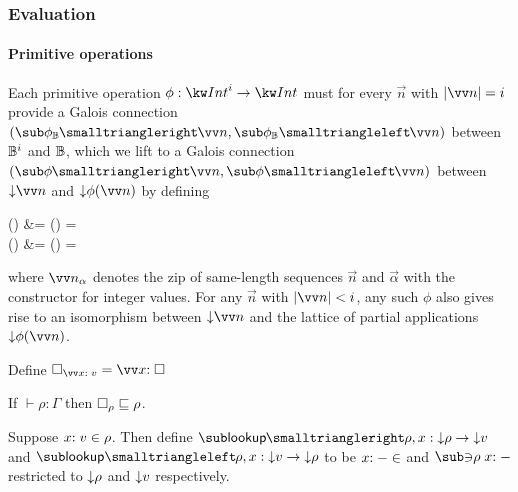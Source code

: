 \subsubsection{Evaluation}

\paragraph{Primitive operations}

Each primitive operation $\phi: \tyInt^{i} \to \tyInt$ must for every $\vec{n}$ with $\length{\vec{n}} = i$ provide a Galois connection $(\primFwdBool{\phi}{\vec{n}}, \primBwdBool{\phi}{\vec{n}})$ between $\mathbb{B}^i$ and $\mathbb{B}$, which we lift to a Galois connection $(\primFwd{\phi}{\vec{n}}, \primBwd{\phi}{\vec{n}})$ between $\Below{\vec{n}}$ and $\Below{\phi(\vec{n})}$ by defining
\begin{definition}
\label{def:core-language:primop-gc}
\begin{salign}
   () &= 
   (\vec{\alpha}) = \beta
   \\
   () &= 
   (\beta) = \vec{\alpha}
\end{salign}
\end{definition}

\noindent where $\vec{\annInt{n}{\alpha}}$ denotes the zip of same-length sequences $\vec{n}$ and $\vec{\alpha}$ with the constructor for integer values. For any $\vec{n}$ with $\length{\vec{n}} \numlt i$, any such $\phi$ also gives rise to an isomorphism between $\Below{\vec{n}}$ and the lattice of partial applications $\Below{\exPrimOp{\phi}{\vec{n}}}$.





\begin{definition}
Define $\hole_{\vec{\bind{x}{v}}} = \vec{\bind{x}{\hole}}$
\end{definition}

\begin{lemma}
\label{lem:core-language:hole-env}If $\vdash \rho: \Gamma$ then $\square_{\rho} \sqsubseteq \rho$.
\end{lemma}

\begin{definition}
   Suppose $x{:}\;v\in{\rho}$. Then define $\envLookupFwdF{\rho,x}: \Below{\rho} \to \Below{v}$ and $\envLookupBwdF{\rho,x}: \Below{v} \to \Below{\rho}$ to be $x{:}\;-\in$ and $\envLookupBwdR{\rho}\bind{x}{-}$ restricted to ${\downarrow}{\rho}$ and ${\downarrow}{v}$ respectively.
\end{definition}

